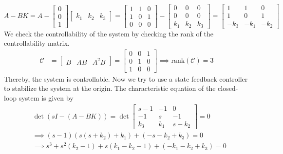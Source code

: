 \begin{equation*}
    A - BK
    =
    A
    -
    \begin{bmatrix}
        0 \\ 0 \\ 1
    \end{bmatrix}
    \begin{bmatrix}
        k_{1} & k_{2} & k_{3}
    \end{bmatrix}
    =
    \begin{bmatrix}
        1 & 1 & 0 \\
        1 & 0 & 1 \\
        0 & 0 & 0
    \end{bmatrix}
    -
    \begin{bmatrix}
        0   & 0   & 0   \\
        0   & 0   & 0   \\
        k_1 & k_2 & k_3
    \end{bmatrix}
    =
    \begin{bmatrix}
        1    & 1    & 0    \\
        1    & 0    & 1    \\
        -k_3 & -k_1 & -k_2
    \end{bmatrix}
\end{equation*}
We check the controllability of the system by checking the rank of the controllability matrix.
\begin{align*}
    \mathcal{C}
     & =
    \begin{bmatrix}
        B & AB & A^{2}B
    \end{bmatrix}
    =
    \begin{bmatrix}
        0 & 0 & 1 \\
        0 & 1 & 0 \\
        1 & 0 & 0
    \end{bmatrix}
    \implies
    \text{rank}(\mathcal{C}) = 3
\end{align*}
Thereby, the system is controllable.
Now we try to use a state feedback controller to stabilize the system at the origin.
The characteristic equation of the closed-loop system is given by
\begin{align*}
     &
    \det(sI-(A-BK))
    =
    \det
    \begin{bmatrix}
        s-1   & -1    & 0       \\
        -1    & s     & -1      \\
        k_{3} & k_{1} & s+k_{2}
    \end{bmatrix}
    =
    0
    \\ &
    \implies
    (s-1)(s(s+k_2) + k_1) + (-s-k_2 + k_3) = 0
    \\ &
    \implies
    s^3 + s^2 (k_2 - 1) + s (k_1 - k_2 - 1) + (-k_1 - k_2 + k_3) = 0
\end{align*}


